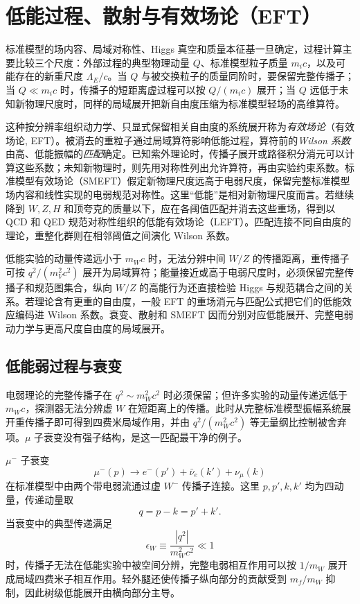 \section{低能过程、散射与有效场论（EFT）}\label{sec:sm-processes-rg-eft-dp11}

标准模型的场内容、局域对称性、Higgs 真空和质量本征基一旦确定，过程计算主要比较三个尺度：外部过程的典型物理动量 $Q$、标准模型粒子质量 $m_ic$，以及可能存在的新重尺度 $\Lambda_E/c$。当 $Q$ 与被交换粒子的质量同阶时，要保留完整传播子；当 $Q\ll m_ic$ 时，传播子的短距离虚过程可以按 $Q/(m_ic)$ 展开；当 $Q$ 远低于未知新物理尺度时，同样的局域展开把新自由度压缩为标准模型轻场的高维算符。

这种按分辨率组织动力学、只显式保留相关自由度的系统展开称为\emph{有效场论}（有效场论, EFT）。被消去的重粒子通过局域算符影响低能过程，算符前的\emph{Wilson 系数}由高、低能振幅的\emph{匹配}确定。已知紫外理论时，传播子展开或路径积分消元可以计算这些系数；未知新物理时，则先用对称性列出允许算符，再由实验约束系数。标准模型有效场论（SMEFT）假定新物理尺度远高于电弱尺度，保留完整标准模型场内容和线性实现的电弱规范对称性。这里“低能”是相对新物理尺度而言。若继续降到 $W,Z,H$ 和顶夸克的质量以下，应在各阈值匹配并消去这些重场，得到以 QCD 和 QED 规范对称性组织的低能有效场论（LEFT）。匹配连接不同自由度的理论，重整化群则在相邻阈值之间演化 Wilson 系数。

低能实验的动量传递远小于 $m_Wc$ 时，无法分辨中间 $W/Z$ 的传播距离，重传播子可按 $q^2/(m_V^2c^2)$ 展开为局域算符；能量接近或高于电弱尺度时，必须保留完整传播子和规范图集合，纵向 $W/Z$ 的高能行为还直接检验 Higgs 与规范耦合之间的关系。若理论含有更重的自由度，一般 EFT 的重场消元与匹配公式把它们的低能效应编码进 Wilson 系数。衰变、散射和 SMEFT 因而分别对应低能展开、完整电弱动力学与更高尺度自由度的局域展开。

\subsection{低能弱过程与衰变}

电弱理论的完整传播子在 \(q^2\sim m_W^2c^2\) 时必须保留；但许多实验的动量传递远低于 \(m_Wc\)，探测器无法分辨虚 \(W\) 在短距离上的传播。此时从完整标准模型振幅系统展开重传播子即可得到四费米局域作用，并由 $q^2/(m_W^2c^2)$ 等无量纲比控制被舍弃项。$\mu$ 子衰变没有强子结构，是这一匹配最干净的例子。

$\mu^-$ 子衰变
\begin{equation*}
 \mu^-(p)\to e^-(p')+\bar\nu_e(k')+\nu_\mu(k)
\end{equation*}
在标准模型中由两个带电弱流通过虚 $W^-$ 传播子连接。这里 $p,p',k,k'$ 均为四动量，传递动量取
\begin{equation*}
 q=p-k=p'+k'.
\end{equation*}
当衰变中的典型传递满足
\begin{equation*}
 \epsilon_W\equiv\frac{|q^2|}{m_W^2c^2}\ll1
\end{equation*}
时，传播子无法在低能实验中被空间分辨，完整电弱相互作用可以按 $1/m_W$ 展开成局域四费米子相互作用。轻外腿还使传播子纵向部分的贡献受到 $m_f/m_W$ 抑制，因此树级低能展开由横向部分主导。

